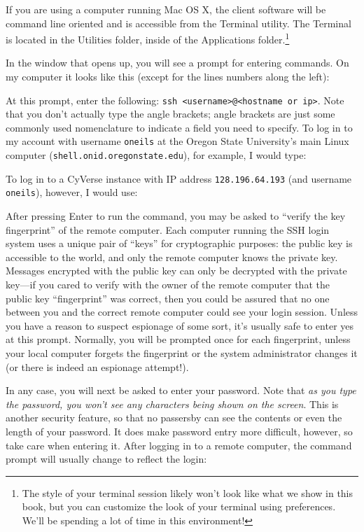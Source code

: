 \documentclass[
]{memoir}
\begin{document}
If you are using a computer running Mac OS X, the client software will be command line oriented and is accessible from the Terminal utility. The Terminal is located in the Utilities folder, inside of the Applications folder.\footnote{The style of your terminal session likely won't look like what we show in this book, but you can customize the look of your terminal using preferences. We'll be spending a lot of time in this environment!}

In the window that opens up, you will see a prompt for entering commands. On my computer it looks like this (except for the lines numbers along the left):

At this prompt, enter the following: \texttt{ssh\ \textless{}username\textgreater{}@\textless{}hostname\ or\ ip\textgreater{}}. Note that you don't actually type the angle brackets; angle brackets are just some commonly used nomenclature to indicate a field you need to specify. To log in to my account with username \texttt{oneils} at the Oregon State University's main Linux computer (\texttt{shell.onid.oregonstate.edu}), for example, I would type:

To log in to a CyVerse instance with IP address \texttt{128.196.64.193} (and username \texttt{oneils}), however, I would use:

After pressing Enter to run the command, you may be asked to \enquote{verify the key fingerprint} of the remote computer. Each computer running the SSH login system uses a unique pair of \enquote{keys} for cryptographic purposes: the public key is accessible to the world, and only the remote computer knows the private key. Messages encrypted with the public key can only be decrypted with the private key---if you cared to verify with the owner of the remote computer that the public key \enquote{fingerprint} was correct, then you could be assured that no one between you and the correct remote computer could see your login session. Unless you have a reason to suspect espionage of some sort, it's usually safe to enter yes at this prompt. Normally, you will be prompted once for each fingerprint, unless your local computer forgets the fingerprint or the system administrator changes it (or there is indeed an espionage attempt!).

In any case, you will next be asked to enter your password. Note that \emph{as you type the password, you won't see any characters being shown on the screen}. This is another security feature, so that no passersby can see the contents or even the length of your password. It does make password entry more difficult, however, so take care when entering it. After logging in to a remote computer, the command prompt will usually change to reflect the login:
\end{document}
